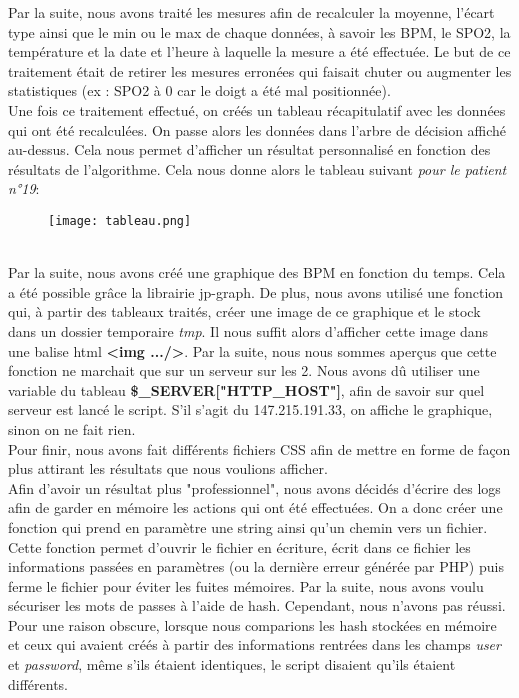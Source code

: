 Par la suite, nous avons traité les mesures afin de recalculer la moyenne, l'écart type ainsi que le min ou le max de chaque données, à savoir les BPM, le SPO2, la température et la date et l'heure à laquelle la mesure a été effectuée.
Le but de ce traitement était de retirer les mesures erronées qui faisait chuter ou augmenter les statistiques (ex : SPO2 à 0 car le doigt a été mal positionnée).
\\

Une fois ce traitement effectué, on créés un tableau récapitulatif avec les données qui ont été recalculées.
On passe alors les données dans l'arbre de décision affiché au-dessus. Cela nous permet d'afficher un résultat personnalisé en fonction des résultats de l'algorithme.
Cela nous donne alors le tableau suivant \textit{pour le patient n°19}:
\begin{figure}[h]
    \centerline{\texttt{[image: tableau.png]}}
\end{figure}
\\
Par la suite, nous avons créé une graphique des BPM en fonction du temps. Cela a été possible grâce la librairie jp-graph. De plus, nous avons utilisé une fonction qui, à partir des tableaux traités, créer une image de ce graphique et le stock dans un dossier temporaire \textit{tmp}. Il nous suffit alors d'afficher cette image dans une balise html \textbf{<img .../>}. Par la suite, nous nous sommes aperçus que cette fonction ne marchait que sur un serveur sur les 2. Nous avons dû utiliser une variable du tableau \textbf{\$\_SERVER["HTTP\_HOST"]}, afin de savoir sur quel serveur est lancé le script. S’il s'agit du 147.215.191.33, on affiche le graphique, sinon on ne fait rien.
\\
Pour finir, nous avons fait différents fichiers CSS afin de mettre en forme de façon plus attirant les résultats que nous voulions afficher.
\\
Afin d'avoir un résultat plus "professionnel", nous avons décidés d'écrire des logs afin de garder en mémoire les actions qui ont été effectuées. On a donc créer une fonction qui prend en paramètre une string ainsi qu'un chemin vers un fichier. Cette fonction permet d'ouvrir le fichier en écriture, écrit dans ce fichier les informations passées en paramètres (ou la dernière erreur générée par PHP) puis ferme le fichier pour éviter les fuites mémoires.
Par la suite, nous avons voulu sécuriser les mots de passes à l'aide de hash. Cependant, nous n'avons pas réussi. Pour une raison obscure, lorsque nous comparions les hash stockées en mémoire et ceux qui avaient créés à partir des informations rentrées dans les champs \textit{user} et \textit{password}, même s’ils étaient identiques, le script disaient qu'ils étaient différents.


